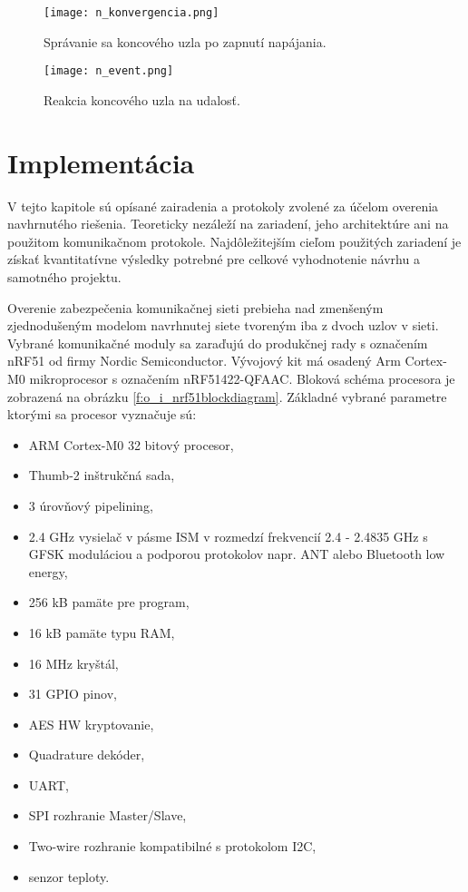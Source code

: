 \documentclass[12pt,a4paper,oneside,openright]{report}
\begin{document}
\begin{figure*}[h]
	\centering
	\texttt{[image: n\_konvergencia.png]}
	\caption{Správanie sa koncového uzla po zapnutí napájania.}
	\label{f:o_konvergencia}
\end{figure*}

\begin{figure*}[h]
	\centering
	\texttt{[image: n\_event.png]}
	\caption{Reakcia koncového uzla na udalosť.}
	\label{f:o_event}
\end{figure*}



\chapter{Implementácia} \label{s_implementation}
V tejto kapitole sú opísané zairadenia a protokoly zvolené za účelom overenia navhrnutého riešenia. Teoreticky nezáleží na zariadení, jeho architektúre ani na použitom komunikačnom protokole. Najdôležitejším cieľom použitých zariadení je získať kvantitatívne výsledky potrebné pre celkové vyhodnotenie návrhu a samotného projektu.

Overenie zabezpečenia komunikačnej sieti prebieha nad zmenšeným zjednodušeným modelom navrhnutej siete tvoreným iba z dvoch uzlov v sieti. Vybrané komunikačné moduly sa zaraďujú do produkčnej rady s označením nRF51 od firmy Nordic Semiconductor. Vývojový kit má osadený Arm Cortex-M0 mikroprocesor s označením nRF51422-QFAAC. Bloková schéma procesora je zobrazená na obrázku \ref{f:o_i_nrf51blockdiagram}. Základné vybrané parametre ktorými sa procesor vyznačuje sú\cite{nRF51}:
\begin{itemize}
	\item ARM Cortex-M0 32 bitový procesor,
	\item Thumb-2 inštrukčná sada,
	\item 3 úrovňový pipelining,
	\item 2.4 GHz vysielač v pásme ISM v rozmedzí frekvencií 2.4 - 2.4835 GHz s GFSK moduláciou a podporou protokolov napr. ANT alebo Bluetooth low energy,
	\item 256 kB pamäte pre program,
	\item 16 kB pamäte typu RAM,
	\item 16 MHz kryštál,
	\item 31 GPIO pinov,
	\item AES HW kryptovanie,
	\item Quadrature dekóder,
	\item UART,
	\item SPI rozhranie Master/Slave,
	\item Two-wire rozhranie kompatibilné s protokolom I2C,
	\item senzor teploty.
\end{itemize}
\onehalfspacing
\end{document}
